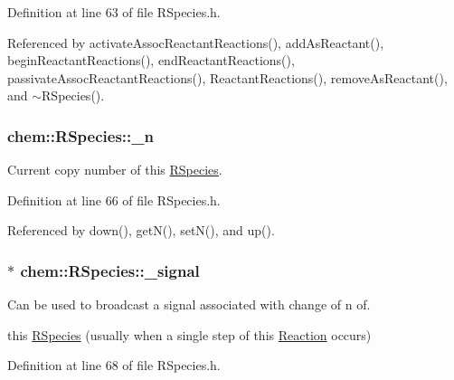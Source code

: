Definition at line 63 of file R\-Species.\-h.



Referenced by activate\-Assoc\-Reactant\-Reactions(), add\-As\-Reactant(), begin\-Reactant\-Reactions(), end\-Reactant\-Reactions(), passivate\-Assoc\-Reactant\-Reactions(), Reactant\-Reactions(), remove\-As\-Reactant(), and $\sim$\-R\-Species().

\hypertarget{classchem_1_1RSpecies_a60e53ebfe464923452c54322dfd479dc}{
\subsubsection[{\-\_\-n}]{ {\bf chem\-::\-R\-Species\-::\-\_\-n}}}\label{classchem_1_1RSpecies_a60e53ebfe464923452c54322dfd479dc}


Current copy number of this \hyperlink{classchem_1_1RSpecies}{R\-Species}. 



Definition at line 66 of file R\-Species.\-h.



Referenced by down(), get\-N(), set\-N(), and up().

\hypertarget{classchem_1_1RSpecies_acd60296c77857284cd935cb6faaf4200}{
\subsubsection[{\-\_\-signal}]{$\ast$ {\bf chem\-::\-R\-Species\-::\-\_\-signal}}}\label{classchem_1_1RSpecies_acd60296c77857284cd935cb6faaf4200}


Can be used to broadcast a signal associated with change of n of. 

this \hyperlink{classchem_1_1RSpecies}{R\-Species} (usually when a single step of this \hyperlink{classchem_1_1Reaction}{Reaction} occurs) 

Definition at line 68 of file R\-Species.\-h.



